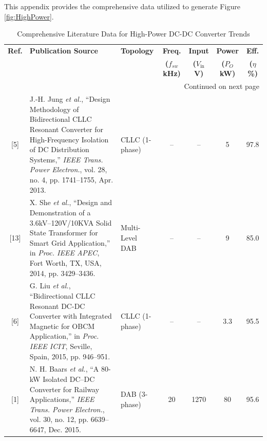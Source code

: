 This appendix provides the comprehensive data utilized to generate Figure \ref{fig:HighPower}. 

\begingroup
\renewcommand{\arraystretch}{1.5}
\setlength{\tabcolsep}{3pt} %
\footnotesize 

\begin{longtable}{c p{} l c c c c}
\caption{Comprehensive Literature Data for High-Power DC-DC Converter Trends}
\label{tab:lit_review_data} \\
\toprule
\textbf{Ref.} & \textbf{Publication Source} & \textbf{Topology} & \textbf{Freq.} & \textbf{Input} & \textbf{Power} & \textbf{Eff.} \\
& & & \textbf{($f_{sw}$ kHz)} & \textbf{($V_{\mathrm{in}}$ V)} & \textbf{($P_O$ kW)} & \textbf{($\eta$ \%)} \\
\midrule
\endfirsthead

\midrule
\multicolumn{7}{r}{{Continued on next page}} \\
\endfoot

\bottomrule
\endlastfoot

[5] & J.-H. Jung \textit{et al.}, ``Design Methodology of Bidirectional CLLC Resonant Converter for High-Frequency Isolation of DC Distribution Systems,'' \textit{IEEE Trans. Power Electron.}, vol. 28, no. 4, pp. 1741--1755, Apr. 2013. & CLLC (1-phase) & -- & -- & 5 & 97.8 \\

[13] & X. She \textit{et al.}, ``Design and Demonstration of a 3.6kV--120V/10KVA Solid State Transformer for Smart Grid Application,'' in \textit{Proc. IEEE APEC}, Fort Worth, TX, USA, 2014, pp. 3429--3436. & Multi-Level DAB & -- & -- & 9 & 85.0 \\

[6] & G. Liu \textit{et al.}, ``Bidirectional CLLC Resonant DC-DC Converter with Integrated Magnetic for OBCM Application,'' in \textit{Proc. IEEE ICIT}, Seville, Spain, 2015, pp. 946--951. & CLLC (1-phase) & -- & -- & 3.3 & 95.5 \\

[1] & N. H. Baars \textit{et al.}, ``A 80-kW Isolated DC--DC Converter for Railway Applications,'' \textit{IEEE Trans. Power Electron.}, vol. 30, no. 12, pp. 6639--6647, Dec. 2015. & DAB (3-phase) & 20 & 1270 & 80 & 95.6 \\


\end{longtable}

